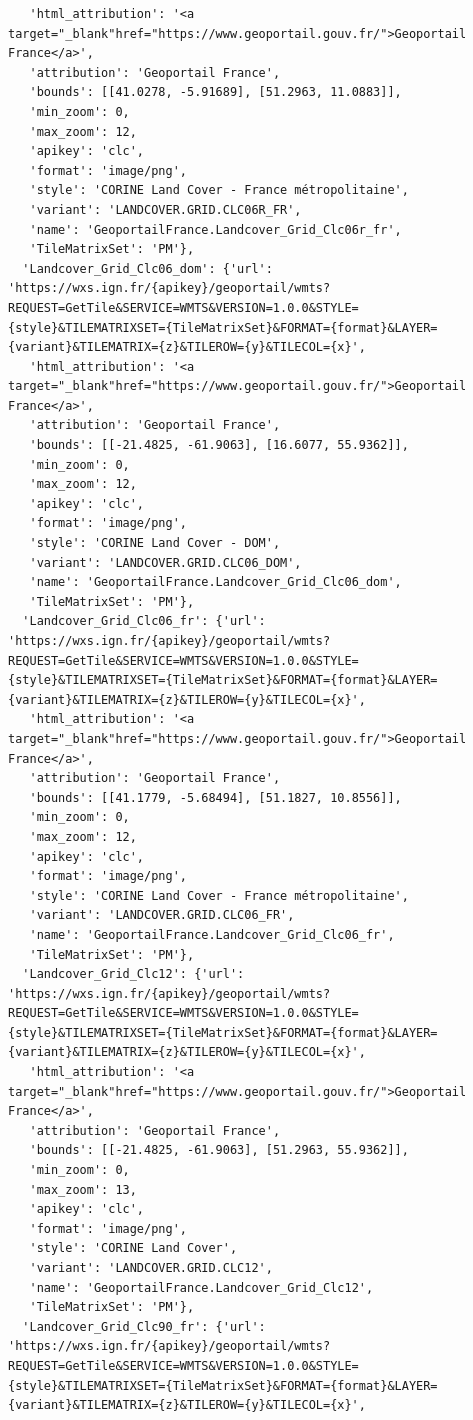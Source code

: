 \documentclass[
  letterpaper,
  DIV=11,
  numbers=noendperiod]{scrreprt}
\begin{document}
\begin{verbatim}
   'html_attribution': '<a target="_blank"href="https://www.geoportail.gouv.fr/">Geoportail France</a>',
   'attribution': 'Geoportail France',
   'bounds': [[41.0278, -5.91689], [51.2963, 11.0883]],
   'min_zoom': 0,
   'max_zoom': 12,
   'apikey': 'clc',
   'format': 'image/png',
   'style': 'CORINE Land Cover - France métropolitaine',
   'variant': 'LANDCOVER.GRID.CLC06R_FR',
   'name': 'GeoportailFrance.Landcover_Grid_Clc06r_fr',
   'TileMatrixSet': 'PM'},
  'Landcover_Grid_Clc06_dom': {'url': 'https://wxs.ign.fr/{apikey}/geoportail/wmts?REQUEST=GetTile&SERVICE=WMTS&VERSION=1.0.0&STYLE={style}&TILEMATRIXSET={TileMatrixSet}&FORMAT={format}&LAYER={variant}&TILEMATRIX={z}&TILEROW={y}&TILECOL={x}',
   'html_attribution': '<a target="_blank"href="https://www.geoportail.gouv.fr/">Geoportail France</a>',
   'attribution': 'Geoportail France',
   'bounds': [[-21.4825, -61.9063], [16.6077, 55.9362]],
   'min_zoom': 0,
   'max_zoom': 12,
   'apikey': 'clc',
   'format': 'image/png',
   'style': 'CORINE Land Cover - DOM',
   'variant': 'LANDCOVER.GRID.CLC06_DOM',
   'name': 'GeoportailFrance.Landcover_Grid_Clc06_dom',
   'TileMatrixSet': 'PM'},
  'Landcover_Grid_Clc06_fr': {'url': 'https://wxs.ign.fr/{apikey}/geoportail/wmts?REQUEST=GetTile&SERVICE=WMTS&VERSION=1.0.0&STYLE={style}&TILEMATRIXSET={TileMatrixSet}&FORMAT={format}&LAYER={variant}&TILEMATRIX={z}&TILEROW={y}&TILECOL={x}',
   'html_attribution': '<a target="_blank"href="https://www.geoportail.gouv.fr/">Geoportail France</a>',
   'attribution': 'Geoportail France',
   'bounds': [[41.1779, -5.68494], [51.1827, 10.8556]],
   'min_zoom': 0,
   'max_zoom': 12,
   'apikey': 'clc',
   'format': 'image/png',
   'style': 'CORINE Land Cover - France métropolitaine',
   'variant': 'LANDCOVER.GRID.CLC06_FR',
   'name': 'GeoportailFrance.Landcover_Grid_Clc06_fr',
   'TileMatrixSet': 'PM'},
  'Landcover_Grid_Clc12': {'url': 'https://wxs.ign.fr/{apikey}/geoportail/wmts?REQUEST=GetTile&SERVICE=WMTS&VERSION=1.0.0&STYLE={style}&TILEMATRIXSET={TileMatrixSet}&FORMAT={format}&LAYER={variant}&TILEMATRIX={z}&TILEROW={y}&TILECOL={x}',
   'html_attribution': '<a target="_blank"href="https://www.geoportail.gouv.fr/">Geoportail France</a>',
   'attribution': 'Geoportail France',
   'bounds': [[-21.4825, -61.9063], [51.2963, 55.9362]],
   'min_zoom': 0,
   'max_zoom': 13,
   'apikey': 'clc',
   'format': 'image/png',
   'style': 'CORINE Land Cover',
   'variant': 'LANDCOVER.GRID.CLC12',
   'name': 'GeoportailFrance.Landcover_Grid_Clc12',
   'TileMatrixSet': 'PM'},
  'Landcover_Grid_Clc90_fr': {'url': 'https://wxs.ign.fr/{apikey}/geoportail/wmts?REQUEST=GetTile&SERVICE=WMTS&VERSION=1.0.0&STYLE={style}&TILEMATRIXSET={TileMatrixSet}&FORMAT={format}&LAYER={variant}&TILEMATRIX={z}&TILEROW={y}&TILECOL={x}',

\end{verbatim}
\end{document}
